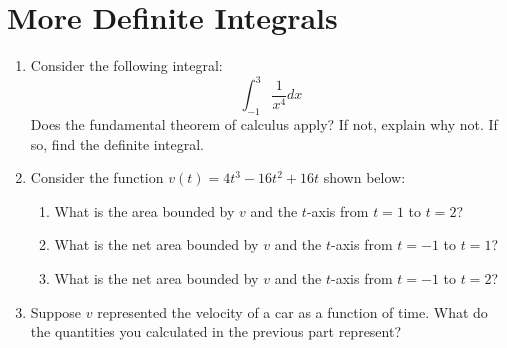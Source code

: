 \documentclass[10pt]{article}
\begin{document}
 \section{More Definite Integrals}
   \begin{enumerate}
    \item Consider the following integral:
    \[\int_{-1}^3\frac{1}{x^4}dx\]
    Does the fundamental theorem of calculus apply? If not, explain why not. If so, find the definite integral.\\
    \item Consider the function $v(t) = 4t^3-16t^2+16t$ shown below:
    \begin{center}
    \end{center}

    \begin{enumerate}
        \item[a)] What is the area bounded by $v$ and the $t$-axis from $t = 1$ to $t = 2$?
        \item[b)] What is the net area bounded by $v$ and the $t$-axis from $t = -1$ to $t = 1$?
        \item[c)] What is the net area bounded by $v$ and the $t$-axis from $t = -1$ to $t = 2$?
    \end{enumerate}

    \item Suppose $v$ represented the velocity of a car as a function of time. What do the quantities you calculated in the previous part represent?
    
\end{enumerate}
\end{document}
